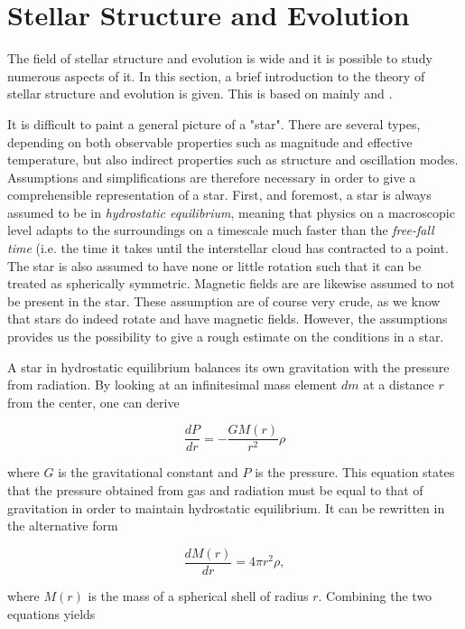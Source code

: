 \chapter{Stellar Structure and Evolution}
\label{stellarstruc}
The field of stellar structure and evolution is wide and it is possible to study numerous aspects of it. In this section, a brief introduction to the theory of stellar structure and evolution is given. This is based on mainly \citet{christensen2008lecture} and \citet{kippenhahn1990stellar}.   

It is difficult to paint a general picture of a "star". There are several types, depending on both observable properties such as magnitude and effective temperature, but also indirect properties such as structure and oscillation modes. Assumptions and simplifications are therefore necessary in order to  give a comprehensible  representation of a star. First, and foremost, a star is always assumed to be in \textit{hydrostatic equilibrium}, meaning that physics on a macroscopic level adapts to the surroundings on a timescale much faster than the \textit{free-fall time} (i.e. the time it takes until the interstellar cloud has contracted to a point. The star is also assumed to have none or little rotation such that it can be treated as spherically symmetric. Magnetic fields are are likewise assumed to not be present in the star. These assumption are of course very crude, as we know that stars do indeed rotate and have magnetic fields. However, the assumptions provides us the possibility to give a rough estimate on the conditions in a star. 

A star in hydrostatic equilibrium balances its own gravitation with the pressure from radiation. By looking at an infinitesimal mass element $dm$ at a distance $r$ from the center, one can derive

\begin{equation}
    \frac{dP}{dr} = - \frac{GM(r)}{r^2}\rho
\end{equation}

\noindent where $G$ is the gravitational constant and $P$ is the pressure. This equation states that the pressure obtained from gas and radiation must be equal to that of gravitation in order to maintain hydrostatic equilibrium. It can be rewritten in the alternative form

\begin{equation}
    \frac{dM(r)}{dr}  = 4\pi r^2 \rho,
\end{equation}

\noindent where $M(r)$ is the mass of a spherical shell of  radius $r$. Combining the two equations yields

